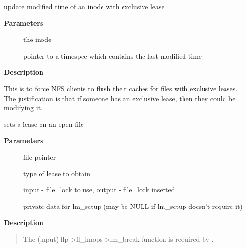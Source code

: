\documentclass[a4paper,8pt,english]{sphinxmanual}
\begin{document}
\begin{fulllineitems}
\label{filesystems/index:c.lease_get_mtime}
update modified time of an inode with exclusive lease

\end{fulllineitems}


\textbf{Parameters}
\begin{description}
\item[{}] \leavevmode
the inode

\item[{}] \leavevmode
pointer to a timespec which contains the last modified time

\end{description}

\textbf{Description}

This is to force NFS clients to flush their caches for files with
exclusive leases.  The justification is that if someone has an
exclusive lease, then they could be modifying it.

\begin{fulllineitems}
\label{filesystems/index:c.generic_setlease}
sets a lease on an open file

\end{fulllineitems}


\textbf{Parameters}
\begin{description}
\item[{}] \leavevmode
file pointer

\item[{}] \leavevmode
type of lease to obtain

\item[{}] \leavevmode
input - file\_lock to use, output - file\_lock inserted

\item[{}] \leavevmode
private data for lm\_setup (may be NULL if lm\_setup
doesn't require it)

\end{description}

\textbf{Description}
\begin{quote}

The (input) flp-\textgreater{}fl\_lmops-\textgreater{}lm\_break function is required
by .
\end{quote}
\end{document}
